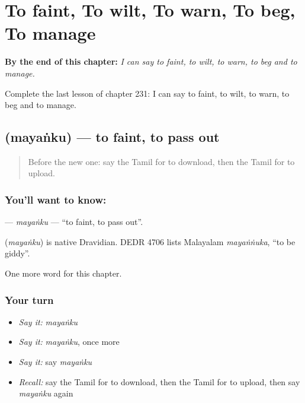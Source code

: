 
\chapter{To faint, To wilt, To warn, To beg, To manage}
\label{ch:ta-to-faint-to-wilt-to-warn-to-beg-to-manage}

\begin{chapteropening}
\textbf{By the end of this chapter:} \emph{I can say to faint, to wilt, to warn, to beg and to manage.}

Complete the last lesson of chapter 231: I can say to faint, to wilt, to warn, to beg and to manage.
\end{chapteropening}

\section[\texorpdfstring{\ta{மயங்கு} (mayaṅku)}{மயங்கு (mayaṅku)}]{ (mayaṅku) — to faint, to pass out}

\label{lesson:TA-C231-mayanku}



\begin{quote}
Before the new one: say the Tamil for to download, then the Tamil for to upload.
\end{quote}

\subsection*{You'll want to know: }
\textbf{} — \emph{mayaṅku} — \textquotedblleft{}to faint, to pass out\textquotedblright{}.

\begin{cousinweb}
\textbf{} (\emph{mayaṅku}) is native Dravidian. DEDR 4706 lists Malayalam \emph{mayaṅṅuka}, \textquotedblleft{}to be giddy\textquotedblright{}.
\end{cousinweb}

\begin{grammarlens}[title={What you've built}]
One more word for this chapter.
\end{grammarlens}

\subsection*{Your turn}
\begin{itemize}
\raggedright
  \item \emph{Say it:} \emph{mayaṅku}
  \item \emph{Say it:} \emph{mayaṅku}, once more
  \item \emph{Say it:} say \emph{mayaṅku}
  \item \emph{Recall:} say the Tamil for to download, then the Tamil for to upload, then say \emph{mayaṅku} again
\end{itemize}

